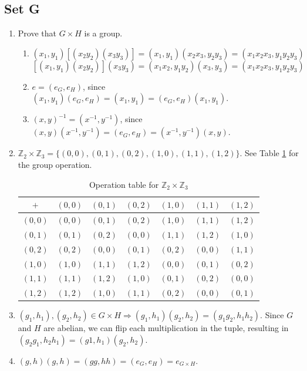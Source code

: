 \documentclass{article}
\begin{document}
\subsection{Set G}
\begin{enumerate}
    \item Prove that $G \times H$ is a group.
        \begin{enumerate}[label=(G\arabic*)]
            \item 
                $$(x_1, y_1)[(x_2y_2)(x_3y_3)] = (x_1, y_1)(x_2x_3, y_2y_3) = (x_1x_2x_3, y_1y_2y_3)$$
                $$[(x_1, y_1)(x_2y_2)](x_3y_3) = (x_1x_2, y_1y_2)(x_3, y_3) = (x_1x_2x_3, y_1y_2y_3)$$
            \item $e = (e_G, e_H)$, since $(x_1, y_1)(e_G, e_H) = (x_1, y_1) = (e_G, e_H)(x_1, y_1)$.
            \item $(x, y)^{-1} = (x^{-1}, y^{-1})$, since $(x, y)(x^{-1}, y^{-1}) = (e_G, e_H) = (x^{-1}, y^{-1})(x, y)$.
        \end{enumerate}
    \item $\mathbb{Z}_2 \times \mathbb{Z}_3 = \{(0, 0), (0, 1), (0, 2), (1, 0), (1, 1), (1, 2)\}$. See Table \ref{tab:z2xz3} for the group operation.
        \begin{table}[!hb]
            \centering
            \begin{tabular}{c|cccccc}
            $+$      & $(0, 0)$ & $(0, 1)$ & $(0, 2)$ & $(1, 0)$ & $(1, 1)$ & $(1, 2)$ \\ \hline
            $(0, 0)$ & $(0, 0)$ & $(0, 1)$ & $(0, 2)$ & $(1, 0)$ & $(1, 1)$ & $(1, 2)$ \\
            $(0, 1)$ & $(0, 1)$ & $(0, 2)$ & $(0, 0)$ & $(1, 1)$ & $(1, 2)$ & $(1, 0)$ \\
            $(0, 2)$ & $(0, 2)$ & $(0, 0)$ & $(0, 1)$ & $(0, 2)$ & $(0, 0)$ & $(1, 1)$ \\
            $(1, 0)$ & $(1, 0)$ & $(1, 1)$ & $(1, 2)$ & $(0, 0)$ & $(0, 1)$ & $(0, 2)$ \\
            $(1, 1)$ & $(1, 1)$ & $(1, 2)$ & $(1, 0)$ & $(0, 1)$ & $(0, 2)$ & $(0, 0)$ \\
            $(1, 2)$ & $(1, 2)$ & $(1, 0)$ & $(1, 1)$ & $(0, 2)$ & $(0, 0)$ & $(0, 1)$
            \end{tabular}
            \caption{Operation table for $\mathbb{Z}_2 \times \mathbb{Z}_3$}
            \label{tab:z2xz3}
        \end{table}
    \item $(g_1, h_1), (g_2, h_2) \in G \times H \Rightarrow (g_1, h_1)(g_2, h_2) = (g_1g_2, h_1h_2)$. Since $G$ and $H$ are abelian, 
        we can flip each multiplication in the tuple, resulting in $(g_2g_1, h_2h_1) =  (g1, h_1)(g_2, h_2)$.
    \item $(g, h)(g, h) = (gg, hh) = (e_G, e_H) = e_{G\times H}$.
\end{enumerate}
\end{document}

